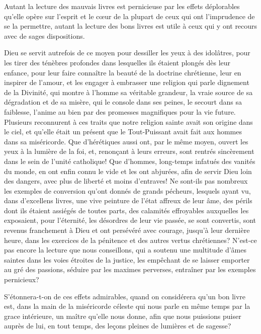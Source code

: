 \documentclass[instructions.tex]{subfiles}
\begin{document}
\secundo Autant la lecture des mauvais livres est pernicieuse par les effets déplorables qu'elle opère sur l'esprit et le cœur de la plupart de ceux qui ont l'imprudence de se la permettre, autant la lecture des bons livres est utile à ceux qui y ont recours avec de sages dispositions.
 
Dieu se servit autrefois de ce moyen pour dessiller les yeux à des idolâtres, pour les tirer des ténèbres profondes dans lesquelles ils étaient plongés dès leur enfance, pour leur faire connaître la beauté de la doctrine chrétienne, leur en inspirer de l'amour, et les engager à embrasser une religion qui parle dignement de la Divinité, qui montre à l'homme sa véritable grandeur, la vraie source de sa dégradation et de sa misère, qui le console dans ses peines, le secourt dans sa faiblesse, l'anime au bien par des promesses magnifiques pour la vie future. Plusieurs reconnurent à ces traits que notre religion sainte avait son origine dans le ciel, et qu'elle était un présent que le Tout-Puissant avait fait aux hommes dans sa miséricorde. Que d'hérétiques aussi ont, par le même moyen, ouvert les yeux à la lumière de la foi, et, renonçant à leurs erreurs, sont rentrés sincèrement dans le sein de l'unité catholique! Que d'hommes, long-temps infatués des vanités du monde, en ont enfin connu le vide et les ont abjurées, afin de servir Dieu loin des dangers, avec plus de liberté et moins d'entraves! Ne sont-ils pas nombreux les exemples de conversion qu'ont donnés de grands pécheurs, lesquels ayant vu, dans d'excellens livres, une vive peinture de l'état affreux de leur âme, des périls dont ils étaient assiégés de toutes parts, des calamités effroyables auxquelles les exposaient, pour l'éternité, les désordres de leur vie passée, se sont convertis, sont revenus franchement à Dieu et ont persévéré avec courage, jusqu'à leur dernière heure, dans les exercices de la pénitence et des autres vertus chrétiennes? N'est-ce pas encore la lecture que nous conseillons, qui a soutenu une multitude d'âmes saintes dans les voies étroites de la justice, les empêchant de se laisser emporter au gré des passions, séduire par les maximes perverses, entraîner par les exemples pernicieux?
 
S'étonnera-t-on de ces effets admirables, quand on considérera qu'un bon livre est, dans la main de la miséricorde céleste qui nous parle en même temps par la grace intérieure, un maître qu'elle nous donne, afin que nous puissions puiser auprès de lui, en tout temps, des leçons pleines de lumières et de sagesse?
 
\end{document}
